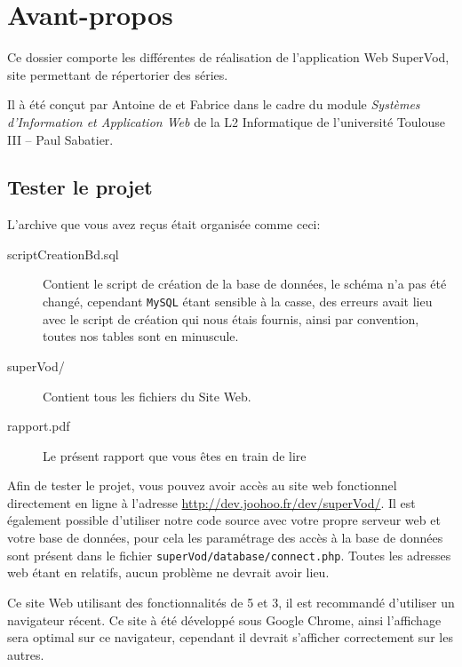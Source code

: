 \documentclass[12pt,a4paper,openany]{book}
\newcommand{\removepagebreak}{\renewcommand{\pagebreak}{}\renewcommand{\clearpage}{}\renewcommand{\cleardoublepage}{}}
\begin{document}
	\setcounter{tocdepth}{2}
	\setcounter{secnumdepth}{3}
	\removepagebreak
	\maketitle
	\newpage
	\chapter*{Avant-propos}
	Ce dossier comporte les différentes de réalisation de l'application Web SuperVod, site permettant de répertorier des séries.

	Il à été conçut par Antoine de  et Fabrice  dans le cadre du module \textit{Systèmes d'Information et Application Web} de la L2 Informatique de l'université Toulouse III -- Paul Sabatier.

	\section*{Tester le projet}
	L'archive que vous avez reçus était organisée comme ceci: 
	\begin{description}
		\item[scriptCreationBd.sql] Contient le script de création de la base de données, le schéma n'a pas été changé, cependant \texttt{MySQL} étant sensible à la
			casse, des erreurs avait lieu avec le script de création qui nous étais fournis, ainsi par convention, toutes nos tables sont en minuscule.
		\item[superVod/] Contient tous les fichiers du Site Web. 
		\item[rapport.pdf] Le présent rapport que vous êtes en train de lire
	\end{description}

	Afin de tester le projet, vous pouvez avoir accès au site web fonctionnel directement en ligne à l'adresse \url{http://dev.joohoo.fr/dev/superVod/}. 
	Il est également possible d'utiliser notre code source avec votre propre serveur web et votre base de données, pour cela les paramétrage des accès à la base de données 
	sont présent dans le fichier \texttt{superVod/database/connect.php}. Toutes les adresses web étant en relatifs, aucun problème ne devrait avoir lieu.

	Ce site Web utilisant des fonctionnalités de 5 et 3, il est recommandé d'utiliser un navigateur récent. Ce site à été développé sous
	Google Chrome, ainsi l'affichage sera optimal sur ce navigateur, cependant il devrait s'afficher correctement sur les autres.
\end{document}

